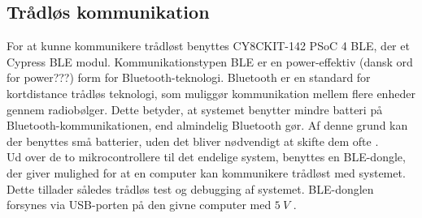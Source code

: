 \subsection{Trådløs kommunikation}
For at kunne kommunikere trådløst benyttes CY8CKIT-142 PSoC 4 BLE, der et Cypress BLE modul. Kommunikationstypen BLE \citep{cypressguide2014} er en power-effektiv (dansk ord for power???) form for Bluetooth-teknologi. Bluetooth er en standard for kortdistance trådløs teknologi, som muliggør kommunikation mellem flere enheder gennem radiobølger. Dette betyder, at systemet benytter mindre batteri på Bluetooth-kommunikationen, end almindelig Bluetooth gør. Af denne grund kan der benyttes små batterier, uden det bliver nødvendigt at skifte dem ofte \citep{gupta2013}. 
\\

Ud over de to mikrocontrollere til det endelige system, benyttes en BLE-dongle, der giver mulighed for at en computer kan kommunikere trådløst med systemet. Dette tillader således trådløs test og debugging af systemet. BLE-donglen forsynes via USB-porten på den givne computer med $5~V$ \citep{cypressguide2014}. 
\\